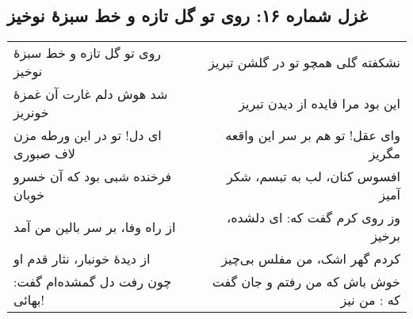 \begin{center}
\section*{غزل شماره ۱۶: روی تو گل تازه و خط سبزهٔ نوخیز}
\label{sec:016}
\begin{longtable}{l p{0.5cm} r}
روی تو گل تازه و خط سبزهٔ نوخیز
&&
نشکفته گلی همچو تو در گلشن تبریز
\\
شد هوش دلم غارت آن غمزهٔ خونریز
&&
این بود مرا فایده از دیدن تبریز
\\
ای دل! تو در این ورطه مزن لاف صبوری
&&
وای عقل! تو هم بر سر این واقعه مگریز
\\
فرخنده شبی بود که آن خسرو خوبان
&&
افسوس کنان، لب به تبسم، شکر آمیز
\\
از راه وفا، بر سر بالین من آمد
&&
وز روی کرم گفت که: ای دلشده، برخیز
\\
از دیدهٔ خونبار، نثار قدم او
&&
کردم گهر اشک، من مفلس بی‌چیز
\\
چون رفت دل گمشده‌ام گفت: بهائی!
&&
خوش باش که من رفتم و جان گفت که : من نیز
\\
\end{longtable}
\end{center}
